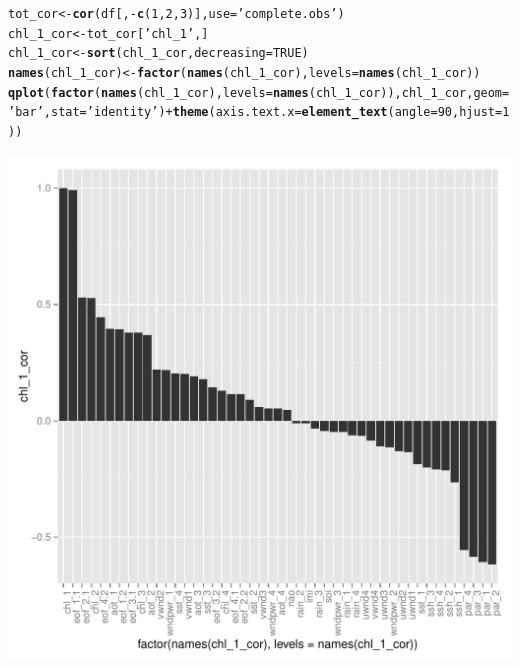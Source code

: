 \documentclass{article}\usepackage[]{graphicx}\usepackage[]{color}
\makeatletter
\def\maxwidth{ %
  \ifdim\Gin@nat@width>\linewidth
    \linewidth
  \else
    \Gin@nat@width
  \fi
}
\newcommand{\hlnum}[1]{\textcolor[rgb]{0.686,0.059,0.569}{#1}}%
\newcommand{\hlstr}[1]{\textcolor[rgb]{0.192,0.494,0.8}{#1}}%
\newcommand{\hlopt}[1]{\textcolor[rgb]{0,0,0}{#1}}%
\newcommand{\hlstd}[1]{\textcolor[rgb]{0.345,0.345,0.345}{#1}}%
\newcommand{\hlkwb}[1]{\textcolor[rgb]{0.69,0.353,0.396}{#1}}%
\newcommand{\hlkwc}[1]{\textcolor[rgb]{0.333,0.667,0.333}{#1}}%
\newcommand{\hlkwd}[1]{\textcolor[rgb]{0.737,0.353,0.396}{\textbf{#1}}}%
\newenvironment{kframe}{%
 \def\at@end@of@kframe{}%
 \ifinner\ifhmode%
  \def\at@end@of@kframe{\end{minipage}}%
  \begin{minipage}{\columnwidth}%
 \fi\fi%
 \def\FrameCommand##1{\hskip\@totalleftmargin \hskip-\fboxsep
 \colorbox{shadecolor}{##1}\hskip-\fboxsep
     \hskip-\linewidth \hskip-\@totalleftmargin \hskip\columnwidth}%
 \MakeFramed {\advance\hsize-\width
   \@totalleftmargin\z@ \linewidth\hsize
   \@setminipage}}%
 {\par\unskip\endMakeFramed%
 \at@end@of@kframe}
\newenvironment{knitrout}{}{} %
\makeatother
\begin{document}
\begin{knitrout}
\color{fgcolor}\begin{kframe}
\begin{alltt}
\hlstd{tot_cor} \hlkwb{<-} \hlkwd{cor}\hlstd{(df[,}\hlopt{-}\hlkwd{c}\hlstd{(}\hlnum{1}\hlstd{,}\hlnum{2}\hlstd{,}\hlnum{3}\hlstd{)],} \hlkwc{use}\hlstd{=}\hlstr{'complete.obs'}\hlstd{)}
\hlstd{chl_1_cor} \hlkwb{<-} \hlstd{tot_cor[}\hlstr{'chl_1'}\hlstd{,]}
\hlstd{chl_1_cor} \hlkwb{<-} \hlkwd{sort}\hlstd{(chl_1_cor,} \hlkwc{decreasing}\hlstd{=}\hlnum{TRUE}\hlstd{)}
\hlkwd{names}\hlstd{(chl_1_cor)} \hlkwb{<-} \hlkwd{factor}\hlstd{(}\hlkwd{names}\hlstd{(chl_1_cor),} \hlkwc{levels}\hlstd{=}\hlkwd{names}\hlstd{(chl_1_cor))}
\hlkwd{qplot}\hlstd{(}\hlkwd{factor}\hlstd{(}\hlkwd{names}\hlstd{(chl_1_cor),} \hlkwc{levels}\hlstd{=}\hlkwd{names}\hlstd{(chl_1_cor)), chl_1_cor,} \hlkwc{geom}\hlstd{=}\hlstr{'bar'}\hlstd{,} \hlkwc{stat}\hlstd{=}\hlstr{'identity'}\hlstd{)} \hlopt{+} \hlkwd{theme}\hlstd{(}\hlkwc{axis.text.x} \hlstd{=} \hlkwd{element_text}\hlstd{(}\hlkwc{angle} \hlstd{=} \hlnum{90}\hlstd{,} \hlkwc{hjust} \hlstd{=} \hlnum{1}\hlstd{))}
\end{alltt}


{\ttfamily\noindent\color{warningcolor}{\#\# Warning: Stacking not well defined when ymin != 0}}\end{kframe}
\includegraphics[width=\maxwidth]{figure/unnamed-chunk-2-1} 

\end{knitrout}
\end{document}

